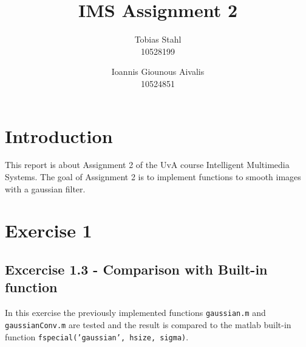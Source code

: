 \documentclass[11pt]{article}
\title{
	\textbf{IMS Assignment 2}
}
\author{Tobias Stahl \\ 10528199 \and Ioannis Giounous Aivalis \\ 10524851 }
\begin{document}
\maketitle


\section{Introduction}
This report is about Assignment 2 of the UvA course Intelligent Multimedia Systems. The goal of Assignment 2 is to implement functions to smooth images with a gaussian filter.\\

\section{Exercise 1}

\subsection{Excercise 1.3 - Comparison with Built-in function}
In this exercise the previously implemented functions \texttt{gaussian.m} and \texttt{gaussianConv.m} are tested and the result is compared to the matlab built-in function \texttt{fspecial('gaussian', hsize, sigma)}.
\end{document}
